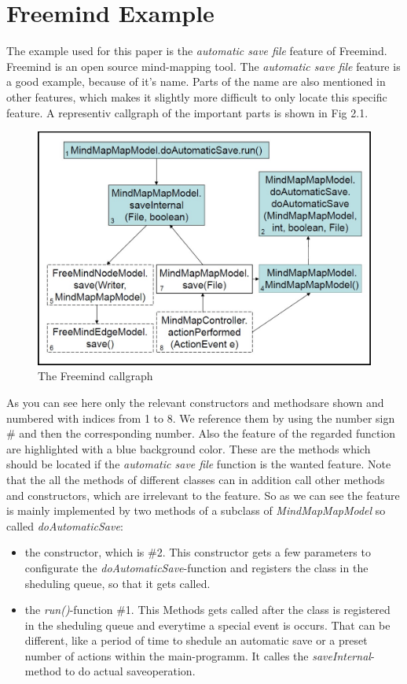 \chapter{Freemind Example}
\label{ch:Freemind Example}

The example used for this paper is the \textit{automatic save file} feature of Freemind. Freemind is an open source  mind-mapping tool. The \textit{automatic save file} feature is a good example, because of it's name. Parts of the name are also mentioned in other features, which makes it slightly more difficult to only locate this specific feature.
A representiv callgraph of the important parts is shown in Fig 2.1.

\begin{figure}
  \centering
  \includegraphics[width=\linewidth]{src/pic/freemind_callgraph}
  \caption{The Freemind callgraph \cite{FrM16} \cite{rubin2013survey}}
\end{figure}

As you can see here only the relevant constructors and methodsare shown and numbered with indices from 1 to 8. We reference them by using the number sign \# and then the corresponding number. Also the feature of the regarded function are highlighted with a blue background color. These are the methods which should be located if the \emph{automatic save file} function is the wanted feature. Note that the all the methods of different classes can in addition call other methods and constructors, which are irrelevant to the feature.
So as we can see the feature is mainly implemented by two methods of a subclass of \emph{MindMapMapModel} so called \emph{doAutomaticSave}:
\begin{itemize} 
\item the constructor, which is \#2. This constructor gets a few parameters to configurate the \emph{doAutomaticSave}-function and registers the class in the sheduling queue, so that it gets called.
\item the \emph{run()}-function \#1. This Methods gets called after the class is registered in the sheduling queue and everytime a special event is occurs. That can be different, like a period of time to shedule an automatic save or a preset number of actions within the main-programm. It calles the \emph{saveInternal}-method to do actual saveoperation.
\end{itemize}

